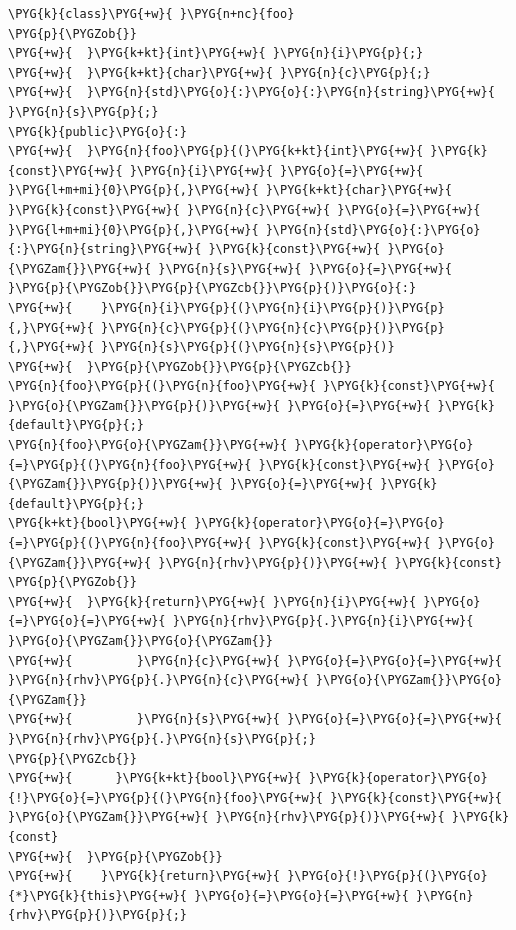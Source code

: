 \begin{codeblockbg}
\begin{Verbatim}[commandchars=\\\{\},breaklines=true,breakanywhere=true,fontsize=\codefont,xleftmargin=17bp]
\PYG{k}{class}\PYG{+w}{ }\PYG{n+nc}{foo}
\PYG{p}{\PYGZob{}}
\PYG{+w}{  }\PYG{k+kt}{int}\PYG{+w}{ }\PYG{n}{i}\PYG{p}{;}
\PYG{+w}{  }\PYG{k+kt}{char}\PYG{+w}{ }\PYG{n}{c}\PYG{p}{;}
\PYG{+w}{  }\PYG{n}{std}\PYG{o}{:}\PYG{o}{:}\PYG{n}{string}\PYG{+w}{ }\PYG{n}{s}\PYG{p}{;}
\PYG{k}{public}\PYG{o}{:}
\PYG{+w}{  }\PYG{n}{foo}\PYG{p}{(}\PYG{k+kt}{int}\PYG{+w}{ }\PYG{k}{const}\PYG{+w}{ }\PYG{n}{i}\PYG{+w}{ }\PYG{o}{=}\PYG{+w}{ }\PYG{l+m+mi}{0}\PYG{p}{,}\PYG{+w}{ }\PYG{k+kt}{char}\PYG{+w}{ }\PYG{k}{const}\PYG{+w}{ }\PYG{n}{c}\PYG{+w}{ }\PYG{o}{=}\PYG{+w}{ }\PYG{l+m+mi}{0}\PYG{p}{,}\PYG{+w}{ }\PYG{n}{std}\PYG{o}{:}\PYG{o}{:}\PYG{n}{string}\PYG{+w}{ }\PYG{k}{const}\PYG{+w}{ }\PYG{o}{\PYGZam{}}\PYG{+w}{ }\PYG{n}{s}\PYG{+w}{ }\PYG{o}{=}\PYG{+w}{ }\PYG{p}{\PYGZob{}}\PYG{p}{\PYGZcb{}}\PYG{p}{)}\PYG{o}{:}
\PYG{+w}{    }\PYG{n}{i}\PYG{p}{(}\PYG{n}{i}\PYG{p}{)}\PYG{p}{,}\PYG{+w}{ }\PYG{n}{c}\PYG{p}{(}\PYG{n}{c}\PYG{p}{)}\PYG{p}{,}\PYG{+w}{ }\PYG{n}{s}\PYG{p}{(}\PYG{n}{s}\PYG{p}{)}
\PYG{+w}{  }\PYG{p}{\PYGZob{}}\PYG{p}{\PYGZcb{}}
\PYG{n}{foo}\PYG{p}{(}\PYG{n}{foo}\PYG{+w}{ }\PYG{k}{const}\PYG{+w}{ }\PYG{o}{\PYGZam{}}\PYG{p}{)}\PYG{+w}{ }\PYG{o}{=}\PYG{+w}{ }\PYG{k}{default}\PYG{p}{;}
\PYG{n}{foo}\PYG{o}{\PYGZam{}}\PYG{+w}{ }\PYG{k}{operator}\PYG{o}{=}\PYG{p}{(}\PYG{n}{foo}\PYG{+w}{ }\PYG{k}{const}\PYG{+w}{ }\PYG{o}{\PYGZam{}}\PYG{p}{)}\PYG{+w}{ }\PYG{o}{=}\PYG{+w}{ }\PYG{k}{default}\PYG{p}{;}
\PYG{k+kt}{bool}\PYG{+w}{ }\PYG{k}{operator}\PYG{o}{=}\PYG{o}{=}\PYG{p}{(}\PYG{n}{foo}\PYG{+w}{ }\PYG{k}{const}\PYG{+w}{ }\PYG{o}{\PYGZam{}}\PYG{+w}{ }\PYG{n}{rhv}\PYG{p}{)}\PYG{+w}{ }\PYG{k}{const}
\PYG{p}{\PYGZob{}}
\PYG{+w}{  }\PYG{k}{return}\PYG{+w}{ }\PYG{n}{i}\PYG{+w}{ }\PYG{o}{=}\PYG{o}{=}\PYG{+w}{ }\PYG{n}{rhv}\PYG{p}{.}\PYG{n}{i}\PYG{+w}{ }\PYG{o}{\PYGZam{}}\PYG{o}{\PYGZam{}}
\PYG{+w}{         }\PYG{n}{c}\PYG{+w}{ }\PYG{o}{=}\PYG{o}{=}\PYG{+w}{ }\PYG{n}{rhv}\PYG{p}{.}\PYG{n}{c}\PYG{+w}{ }\PYG{o}{\PYGZam{}}\PYG{o}{\PYGZam{}}
\PYG{+w}{         }\PYG{n}{s}\PYG{+w}{ }\PYG{o}{=}\PYG{o}{=}\PYG{+w}{ }\PYG{n}{rhv}\PYG{p}{.}\PYG{n}{s}\PYG{p}{;}
\PYG{p}{\PYGZcb{}}
\PYG{+w}{      }\PYG{k+kt}{bool}\PYG{+w}{ }\PYG{k}{operator}\PYG{o}{!}\PYG{o}{=}\PYG{p}{(}\PYG{n}{foo}\PYG{+w}{ }\PYG{k}{const}\PYG{+w}{ }\PYG{o}{\PYGZam{}}\PYG{+w}{ }\PYG{n}{rhv}\PYG{p}{)}\PYG{+w}{ }\PYG{k}{const}
\PYG{+w}{  }\PYG{p}{\PYGZob{}}
\PYG{+w}{    }\PYG{k}{return}\PYG{+w}{ }\PYG{o}{!}\PYG{p}{(}\PYG{o}{*}\PYG{k}{this}\PYG{+w}{ }\PYG{o}{=}\PYG{o}{=}\PYG{+w}{ }\PYG{n}{rhv}\PYG{p}{)}\PYG{p}{;}

\end{Verbatim}
\end{codeblockbg}
